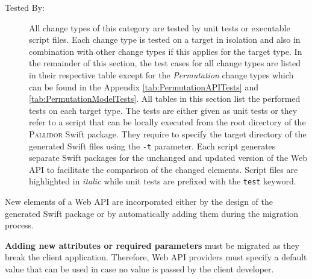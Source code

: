 \begin{description}
\item[Tested By:] All change types of this category are tested by unit tests or executable script files. Each change type is tested on a target in isolation and also in combination with other change types if this applies for the target type. In the remainder of this section, the test cases for all change types are listed in their respective table except for the \textit{Permutation} change types which can be found in the Appendix \ref{tab:PermutationAPITests} and \ref{tab:PermutationModelTests}. All tables in this section list the performed tests on each target type. The tests are either given as unit tests or they refer to a script that can be locally executed from the root directory of the \textsc{Pallidor} Swift package. They require to specify the target directory of the generated Swift files using the \texttt{-t} parameter. Each script generates separate Swift packages for the unchanged and updated version of the Web API to facilitate the comparison of the changed elements. Script files are highlighted in \textit{italic} while unit tests are prefixed with the \texttt{test} keyword.
\end{description}
\vspace{0.5cm}
New elements of a Web API are incorporated either by the design of the generated Swift package or by automatically adding them during the migration process.

 \textbf{Adding new attributes or required parameters} must be migrated as they break the client application. Therefore, Web API providers must specify a default value that can be used in case no value is passed by the client developer.
 
